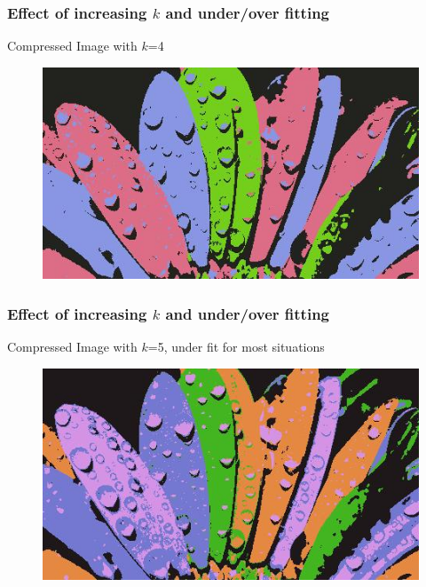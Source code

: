 \documentclass{beamer}
\begin{document}
\begin{frame}
\frametitle{Effect of increasing $k$ and under/over fitting}
\begin{center}
Compressed Image with $k$=4
\end{center}
\begin{figure}
\includegraphics[scale=0.7]{flower_compressed_4.jpg}
\end{figure}
\end{frame}

\begin{frame}
\frametitle{Effect of increasing $k$ and under/over fitting}
\begin{center}
Compressed Image with $k$=5, under fit for most situations
\end{center}
\begin{figure}
\includegraphics[scale=0.7]{flower_compressed_5.jpg}
\end{figure}
\end{frame}
\end{document}
